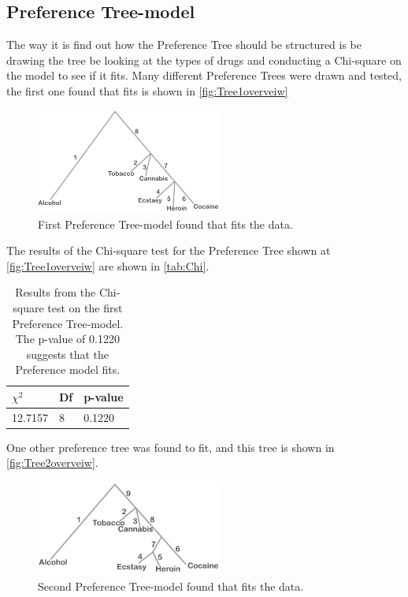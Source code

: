 \subsection*{Preference Tree-model}
The way it is find out how the Preference Tree should be structured is be drawing the tree be looking at the types of drugs and conducting a Chi-square on the model to see if it fits. Many different Preference Trees were drawn and tested, the first one found that fits is shown in \autoref{fig:Tree1overveiw}
%
\begin{figure}[H]
\centering
\includegraphics[width = 0.55\textwidth, angle = 90]{Figure/Tree1overview}
\caption{First Preference Tree-model found that fits the data.}
\label{fig:Tree1overveiw}
\end{figure}
\noindent
%
The results of the Chi-square test for the Preference Tree shown at \autoref{fig:Tree1overveiw} are shown in \autoref{tab:Chi}. 
%
\begin{table}[H]
\centering
\begin{tabular}{@{}lll@{}}
\toprule
$\chi^{2}$   & Df  & p-value \\ \midrule
12.7157      & 8   & 0.1220  \\ \bottomrule
\end{tabular}
\caption{Results from the Chi-square test on the first Preference Tree-model. The p-value of 0.1220 suggests that the Preference model fits.}
\label{tab:Chi1}
\end{table} 
\noindent
%
One other preference tree was found to fit, and this tree is shown in \autoref{fig:Tree2overveiw}. 
%
\begin{figure}[H]
\centering
\includegraphics[width = 0.55\textwidth, angle = 90]{Figure/Tree2overview}
\caption{Second Preference Tree-model found that fits the data.}
\label{fig:Tree2overveiw}
\end{figure}
